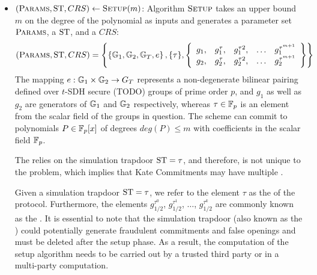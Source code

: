 \begin{itemize}
\item $(\textsc{Params}, \mathrm{ST}, CRS)\leftarrow \textsc{Setup}(m)$: Algorithm $\textsc{Setup}$ takes an upper bound $m$ on the degree of the polynomial as inputs and generates a parameter set $\textsc{Params}$, a  $\mathrm{ST}$, and a  $CRS$:
\begin{equation}
(\textsc{Params}, \mathrm{ST}, CRS) = 
\left\{
\left\{\mathbb{G}_1,\mathbb{G}_2, \mathbb{G}_T, e\right\}, 
\{\tau\}, 
\left\{
\begin{array}{ccccc}
g_1, & g_1^\tau, & g_1^{\tau2}, & \ldots & g_1^{\tau^{m+1}} \\
g_2, & g_2^\tau, & g_2^{\tau2}, & \ldots & g_2^{\tau^{m+1}} 
\end{array}
\right\} 
\right\}
\end{equation}
The mapping $e:\mathbb{G}_1 \times \mathbb{G}_2 \rightarrow G_T$ represents a non-degenerate bilinear pairing defined over $t$-SDH secure (TODO) groups of prime order $p$, and $g_1$ as well as $g_2$ are generators of $\mathbb{G}_1$ and $\mathbb{G}_2$ respectively, whereas $\tau\in \mathbb{F}_{p}$ is an element from the scalar field of the groups in question. The scheme can commit to polynomials $P\in \mathbb{F}_p[x]$ of degrees $deg(P)\leq m$ with coefficients in the scalar field $\mathbb{F}_p$.

The  relies on the simulation trapdoor $\mathrm{ST}={\tau}$, and therefore, is not unique to the problem, which implies that Kate Commitments may have multiple .

Given a simulation trapdoor $\mathrm{ST} = {\tau}$, we refer to the element $\tau$ as the  of the protocol. Furthermore, the elements $g_{1/2}^{\tau^0}$, $g_{1/2}^{\tau^1}$, $\ldots$, $g_{1/2}^{\tau^k}$ are commonly known as the . It is essential to note that the simulation trapdoor (also known as the ) could potentially generate fraudulent commitments and false openings and must be deleted after the setup phase. As a result, the computation of the setup algorithm needs to be carried out by a trusted third party or in a multi-party computation.


\end{itemize}
